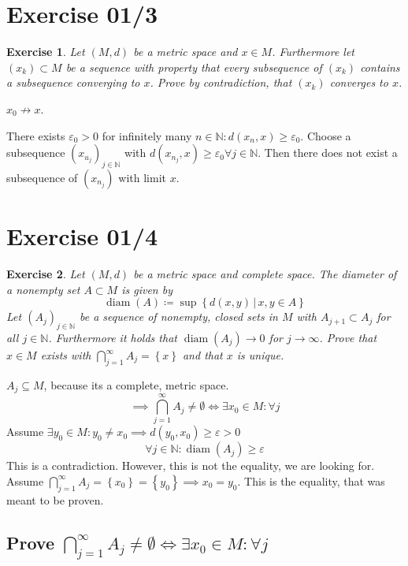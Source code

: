 \documentclass{article}
\newtheorem{ex}{Exercise} %
\newcommand{\set}[1]{\left\{#1\right\}}
\newcommand{\setdef}[2]{\left\{\left.#1\,\right|\,#2\right\}}
\begin{document}
\section{Exercise 01/3}

\begin{ex}
  Let $(M, d)$ be a metric space and $x \in M$.
  Furthermore let $(x_k) \subset M$ be a sequence with property that every subsequence of $(x_k)$ contains a subsequence converging to $x$.
  Prove by contradiction, that $(x_k)$ converges to $x$.
\end{ex}

$x_0 \not\to x$.

There exists $\varepsilon_0 > 0$ for infinitely many $n \in \mathbb N: d(x_n, x) \geq \varepsilon_0$.
Choose a subsequence $(x_{u_j})_{j\in\mathbb N}$ with $d(x_{n_j}, x) \geq \varepsilon_0 \forall j \in \mathbb N$.
Then there does not exist a subsequence of $(x_{n_j})$ with limit $x$.

\section{Exercise 01/4}

\begin{ex}
  Let $(M, d)$ be a metric space and complete space. The diameter of a nonempty set $A \subset M$ is given by
  \[ \operatorname{diam}(A) \coloneqq \sup\setdef{d(x,y)}{x,y \in A} \]
  Let $(A_j)_{j\in\mathbb N}$ be a sequence of nonempty, closed sets in $M$ with $A_{j+1} \subset A_j$ for all $j \in \mathbb N$.
  Furthermore it holds that $\operatorname{diam}(A_j) \to 0$ for $j \to \infty$. Prove that $x \in M$ exists with
  $\bigcap_{j=1}^\infty A_j = \set{x}$ and that $x$ is unique.
\end{ex}

$A_j \subseteq M$, because its a complete, metric space.
\[ \implies \bigcap_{j=1}^\infty A_j \neq \emptyset \iff \exists x_0 \in M: \forall j \]
Assume $\exists y_0 \in M: y_0 \neq x_0 \implies d(y_0, x_0) \geq \varepsilon > 0$
\[ \forall j \in \mathbb N: \operatorname{diam}(A_j) \geq \varepsilon \]
This is a contradiction.
However, this is not the equality, we are looking for.
Assume $\bigcap_{j=1}^\infty A_j = \set{x_0} = \set{y_0} \implies x_0 = y_0$.
This is the equality, that was meant to be proven.

\subsection{Prove $\bigcap_{j=1}^\infty A_j \neq \emptyset \iff \exists x_0 \in M: \forall j$}
\end{document}
